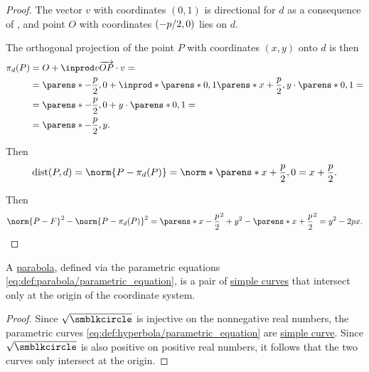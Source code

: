 \begin{proof}
   The vector \( v \) with coordinates \( (0, 1) \) is directional for \( d \) as a consequence of , and point \( O \) with coordinates \( (-\ifrac p 2, 0) \) lies on \( d \).

  The orthogonal projection of the point \( P \) with coordinates \( (x, y) \) onto \( d \) is then
  \begin{align*}
    \pi_d(P)
    &=
    O + \inprod v {\vect{OP}} \cdot v
    = \\ &=
    \parens*{ -\frac p 2, 0 } + \inprod*{ \parens*{ 0, 1 } } { \parens*{ x + \frac p 2, y } } \cdot \parens*{ 0, 1 }
    = \\ &=
    \parens*{ -\frac p 2, 0 } + y \cdot \parens*{ 0, 1 }
    = \\ &=
    \parens*{ -\frac p 2, y }.
  \end{align*}

  Then
  \begin{equation*}
    \op{dist}(P, d)
    =
    \norm{P - \pi_d(P)}
    =
    \norm*{\parens*{ x + \frac p 2, 0 }}
    =
    x + \frac p 2.
  \end{equation*}

  Then
  \begin{equation*}
    \norm{P - F}^2 - \norm{P - \pi_d(P)}^2
    =
    \parens*{ x - \frac p 2 }^2 + y^2 - \parens*{ x + \frac p 2 }^2
    =
    y^2 - 2px.
  \end{equation*}
\end{proof}

\begin{proposition}\label{thm:parabola_is_closed_simple_curve}
  A \hyperref[def:parabola]{parabola}, defined via the parametric equations \eqref{eq:def:parabola/parametric_equation}, is a pair of \hyperref[def:simple_curve]{simple curves} that intersect only at the origin of the coordinate system.
\end{proposition}
\begin{proof}
  Since \( \sqrt {\anon} \) is injective on the nonnegative real numbers, the parametric curves \eqref{eq:def:hyperbola/parametric_equation} are \hyperref[def:simple_curve]{simple curve}. Since \( \sqrt {\anon} \) is also positive on positive real numbers, it follows that the two curves only intersect at the origin.
\end{proof}

